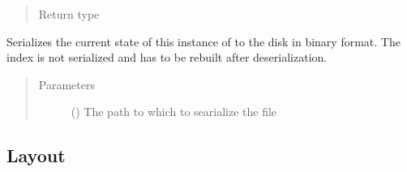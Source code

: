 \documentclass[letterpaper,10pt,english]{sphinxmanual}
\begin{document}
\begin{fulllineitems}
\begin{fulllineitems}
\begin{quote}
\begin{description}
\item[{Return type}] \leavevmode
{}

\end{description}\end{quote}

\end{fulllineitems}


\begin{fulllineitems}
\label{\detokenize{documentation:tmap.LSHForest.store}}
Serializes the current state of this instance of {\hyperref[\detokenize{documentation:tmap.LSHForest}]{}} to the disk in binary format. The index is not serialized and has to be rebuilt after deserialization.
\begin{quote}\begin{description}
\item[{Parameters}] \leavevmode
{} () \textendash{} The path to which to searialize the file

\end{description}\end{quote}

\end{fulllineitems}


\end{fulllineitems}



\subsection{Layout}
\label{\detokenize{documentation:layout}}\label{\detokenize{documentation:layout-doc}}
\end{document}
